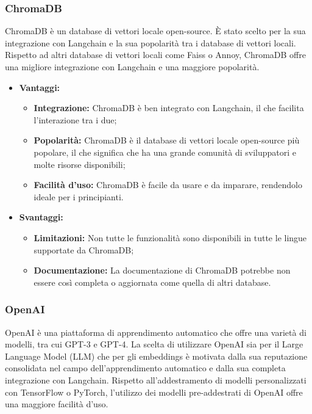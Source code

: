 \documentclass[10pt, a4paper]{article}
\begin{document}
\subsubsection{ChromaDB}
ChromaDB è un database di vettori locale open-source. È stato scelto per la sua integrazione con Langchain e la sua popolarità tra i database di vettori locali. Rispetto ad altri database di vettori locali come Faiss o Annoy, ChromaDB offre una migliore integrazione con Langchain e una maggiore popolarità.

\begin{itemize}
\item \textbf{Vantaggi:}
\begin{itemize}
\item \textbf{Integrazione:} ChromaDB è ben integrato con Langchain, il che facilita l'interazione tra i due;
\item \textbf{Popolarità:} ChromaDB è il database di vettori locale open-source più popolare, il che significa che ha una grande comunità di sviluppatori e molte risorse disponibili;
\item \textbf{Facilità d'uso:} ChromaDB è facile da usare e da imparare, rendendolo ideale per i principianti.
\end{itemize}
\item \textbf{Svantaggi:}
\begin{itemize}
\item \textbf{Limitazioni:} Non tutte le funzionalità sono disponibili in tutte le lingue supportate da ChromaDB;
\item \textbf{Documentazione:} La documentazione di ChromaDB potrebbe non essere così completa o aggiornata come quella di altri database.
\end{itemize}
\end{itemize}

\subsubsection{OpenAI}
OpenAI è una piattaforma di apprendimento automatico che offre una varietà di modelli, tra cui GPT-3 e GPT-4. La scelta di utilizzare OpenAI sia per il Large Language Model (LLM) che per gli embeddings è motivata dalla sua reputazione consolidata nel campo dell'apprendimento automatico e dalla sua completa integrazione con Langchain. Rispetto all’addestramento di modelli personalizzati con TensorFlow o PyTorch, l’utilizzo dei modelli pre-addestrati di OpenAI offre una maggiore facilità d’uso.
\end{document}
